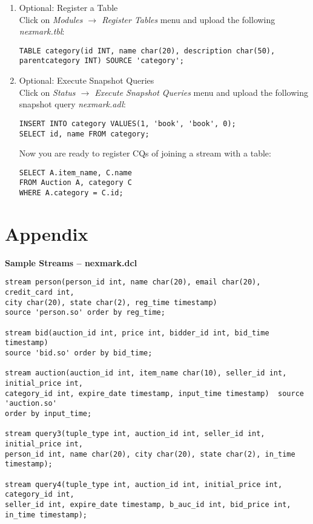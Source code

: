 \documentclass[10pt]{article}
\begin{document}
\begin{enumerate}
\item Optional: Register a Table\\
Click on {\em Modules $\rightarrow$ Register Tables} menu and upload the following {\em nexmark.tbl}:
\begin{verbatim}
TABLE category(id INT, name char(20), description char(50), parentcategory INT) SOURCE 'category';
\end{verbatim}

\item Optional: Execute Snapshot Queries\\
Click on {\em Status $\rightarrow$ Execute Snapshot Queries} menu and upload the following snapshot query {\em nexmark.adl}:
\begin{verbatim}
INSERT INTO category VALUES(1, 'book', 'book', 0);
SELECT id, name FROM category;
\end{verbatim}

Now you are ready to register CQs of joining a stream with a table:
\begin{verbatim}
SELECT A.item_name, C.name
FROM Auction A, category C
WHERE A.category = C.id;
\end{verbatim}
\end{enumerate}



\section{Appendix}
{\bf Sample Streams -- nexmark.dcl}
\begin{verbatim}
stream person(person_id int, name char(20), email char(20), credit_card int, 
city char(20), state char(2), reg_time timestamp) 
source 'person.so' order by reg_time;

stream bid(auction_id int, price int, bidder_id int, bid_time timestamp)
source 'bid.so' order by bid_time;

stream auction(auction_id int, item_name char(10), seller_id int, initial_price int, 
category_id int, expire_date timestamp, input_time timestamp)  source 'auction.so' 
order by input_time;

stream query3(tuple_type int, auction_id int, seller_id int, initial_price int, 
person_id int, name char(20), city char(20), state char(2), in_time timestamp);

stream query4(tuple_type int, auction_id int, initial_price int, category_id int, 
seller_id int, expire_date timestamp, b_auc_id int, bid_price int, in_time timestamp);
\end{verbatim}
\end{document}
